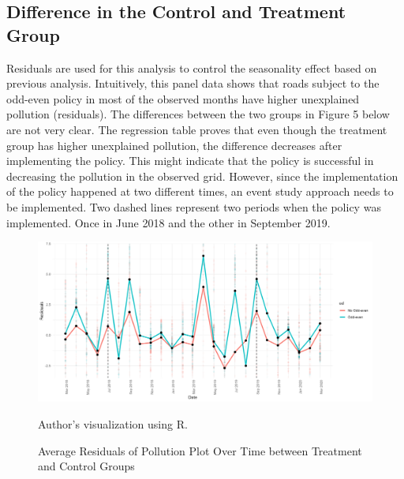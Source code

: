 \documentclass[AEJ]{AEA}
\begin{document}
\subsection{Difference in the Control and Treatment
Group}
Residuals are used for this analysis to control the seasonality effect based on previous analysis. Intuitively, this panel data shows that roads subject to the odd-even policy in most of the observed months have higher unexplained pollution (residuals). The differences between the two groups in Figure 5 below are not very clear. The regression table proves that even though the treatment group has higher unexplained pollution, the difference decreases after implementing the policy. This might indicate that the policy is successful in decreasing the pollution in the observed grid. However, since the implementation of the policy happened at two different times, an event study approach needs to be implemented. Two dashed lines represent two periods when the policy was implemented. Once in June 2018 and the other in September 2019.

\begin{figure}[hbt!]
    \centering
    \includegraphics[width=1\linewidth]{Graphs/Graphoutput_plot.png}
    \caption{Average Residuals of Pollution Plot Over Time between Treatment and Control Groups}
    \label{fig:enter-label}
        \begin{figurenotes}[Source]
Author's visualization using R.
\end{figurenotes}
\end{figure}
\end{document}
